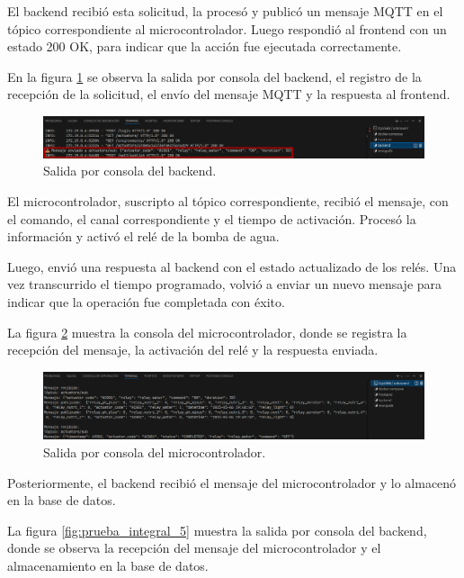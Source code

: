 El backend recibió esta solicitud, la procesó y publicó un mensaje MQTT en el
tópico correspondiente al microcontrolador. Luego respondió al frontend con un
estado 200 OK, para indicar que la acción fue ejecutada correctamente.

En la figura \ref{fig:prueba_integral_3} se observa la salida por consola del
backend, el registro de la recepción de la solicitud, el envío del mensaje MQTT
y la respuesta al frontend.

\begin{figure}[H]
    \centering
    \includegraphics[width=\textwidth]{Images/59_prueba_integral_3.png}
    \caption[Salida por consola del backend]{Salida por consola del backend.}
    \label{fig:prueba_integral_3}
\end{figure}

El microcontrolador, suscripto al tópico correspondiente, recibió el mensaje,
con el comando, el canal correspondiente y el tiempo de activación. Procesó la
información y activó el relé de la bomba de agua.

Luego, envió una respuesta al backend con el estado actualizado de los relés.
Una vez transcurrido el tiempo programado, volvió a enviar un nuevo mensaje
para indicar que la operación fue completada con éxito.

La figura \ref{fig:prueba_integral_4} muestra la consola del microcontrolador,
donde se registra la recepción del mensaje, la activación del relé y la
respuesta enviada.

\begin{figure}[H]
    \centering
    \includegraphics[width=\textwidth]{Images/59_prueba_integral_4.png}
    \caption[Salida por consola del microcontrolador]{Salida por consola del microcontrolador.}
    \label{fig:prueba_integral_4}
\end{figure}

Posteriormente, el backend recibió el mensaje del microcontrolador y lo
almacenó en la base de datos.

La figura \ref{fig:prueba_integral_5} muestra la salida por consola del
backend, donde se observa la recepción del mensaje del microcontrolador y el
almacenamiento en la base de datos.

